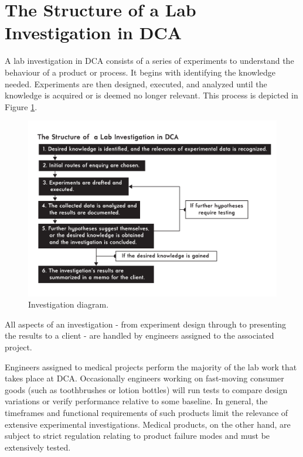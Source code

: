\documentclass[11pt,a4paper,article]{memoir} %
\begin{document}
\section{The Structure of a Lab Investigation in DCA}
A lab investigation in DCA consists of a series of experiments to understand the behaviour of a product or process. It begins with identifying the knowledge needed. Experiments are then designed, executed, and analyzed until the knowledge is acquired or is deemed no longer relevant. This process is depicted in Figure \ref{fig:investigation_diagram}.
\begin{figure}[h!]
\centering
\includegraphics[width=1.2\textwidth]{Lab_Investigation_Diagram.pdf}
\caption{Investigation diagram.}
\label{fig:investigation_diagram}
\end{figure}
All aspects of an investigation - from experiment design through to presenting the results to a client - are handled by engineers assigned to the associated project. 
\par
Engineers assigned to medical projects perform the majority of the lab work that takes place at DCA. Occasionally engineers working on fast-moving consumer goods (such as toothbrushes or lotion bottles) will run tests to compare design variations or verify performance relative to some baseline. In general, the timeframes and functional requirements of such products limit the relevance of extensive experimental investigations. Medical products, on the other hand, are subject to strict regulation relating to product failure modes and must be extensively tested.
\par
\end{document}
